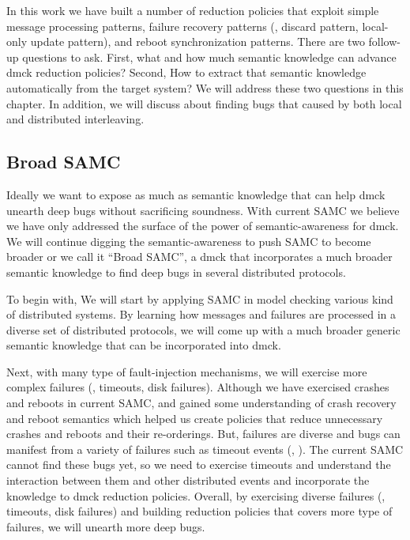 In this work we have built a number of reduction policies that exploit simple
message processing patterns, failure recovery patterns (\eg, discard pattern,
local-only update pattern), and reboot synchronization patterns. There are two
follow-up questions to ask.  First, what and how much semantic knowledge can
advance dmck reduction policies?  Second, How to extract that semantic knowledge
automatically from the target system? We will address these two questions in
this chapter. In addition, we will discuss about finding bugs that caused by
both local and distributed interleaving.

\subsection{Broad SAMC}
Ideally we want to expose as much as semantic knowledge that can help dmck
unearth deep bugs without sacrificing soundness. With current SAMC we believe we
have only addressed the surface of the power of semantic-awareness for dmck.  We
will continue digging the semantic-awareness to push SAMC to become broader or
we call it ``Broad SAMC'', a dmck that incorporates a much broader semantic
knowledge to find deep bugs in several distributed protocols. 

To begin with, We will start by applying SAMC in model checking various kind of
distributed systems. By learning how messages and failures are processed in a
diverse set of distributed protocols, we will come up with a much broader generic
semantic knowledge that can be incorporated into dmck.

Next, with many type of fault-injection mechanisms, we will exercise more
complex failures (\eg, timeouts, disk failures). Although we have exercised
crashes and reboots in current SAMC, and gained some understanding of crash
recovery and reboot semantics which helped us create policies that reduce
unnecessary crashes and reboots and their re-orderings. But, failures are
diverse and bugs can manifest from a variety of failures such as timeout events
(, ). The current SAMC cannot find these bugs yet, so we need
to exercise timeouts and understand the interaction between them and other
distributed events and incorporate the knowledge to dmck reduction policies.
Overall, by exercising diverse failures (\eg, timeouts, disk failures) and
building reduction policies that covers more type of failures, we will unearth
more deep bugs.

